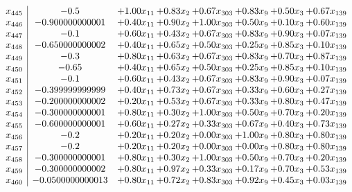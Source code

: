 \documentclass[8pt]{article}
\begin{document}
\[\begin{array}{c| c c@{\hskip 2pt} c@{\hskip 2pt} c@{\hskip 2pt} c@{\hskip 2pt} c@{\hskip 2pt} c@{\hskip 2pt} }
 x_{445}   &  -0.5 & +  1.00 x_{11} & +  0.83 x_{2} & +  0.67 x_{303} & +  0.83 x_{9} & +  0.50 x_{3} & +  0.67 x_{139}\\
 x_{446}   &  -0.900000000001 & +  0.40 x_{11} & +  0.90 x_{2} & +  1.00 x_{303} & +  0.50 x_{9} & +  0.10 x_{3} & +  0.60 x_{139}\\
 x_{447}   &  -0.1 & +  0.60 x_{11} & +  0.43 x_{2} & +  0.67 x_{303} & +  0.83 x_{9} & +  0.90 x_{3} & +  0.07 x_{139}\\
 x_{448}   &  -0.650000000002 & +  0.40 x_{11} & +  0.65 x_{2} & +  0.50 x_{303} & +  0.25 x_{9} & +  0.85 x_{3} & +  0.10 x_{139}\\
 x_{449}   &  -0.3 & +  0.80 x_{11} & +  0.63 x_{2} & +  0.67 x_{303} & +  0.83 x_{9} & +  0.70 x_{3} & +  0.87 x_{139}\\
 x_{450}   &  -0.65 & +  0.40 x_{11} & +  0.65 x_{2} & +  0.50 x_{303} & +  0.25 x_{9} & +  0.85 x_{3} & +  0.10 x_{139}\\
 x_{451}   &  -0.1 & +  0.60 x_{11} & +  0.43 x_{2} & +  0.67 x_{303} & +  0.83 x_{9} & +  0.90 x_{3} & +  0.07 x_{139}\\
 x_{452}   &  -0.399999999999 & +  0.40 x_{11} & +  0.73 x_{2} & +  0.67 x_{303} & +  0.33 x_{9} & +  0.60 x_{3} & +  0.27 x_{139}\\
 x_{453}   &  -0.200000000002 & +  0.20 x_{11} & +  0.53 x_{2} & +  0.67 x_{303} & +  0.33 x_{9} & +  0.80 x_{3} & +  0.47 x_{139}\\
 x_{454}   &  -0.300000000001 & +  0.80 x_{11} & +  0.30 x_{2} & +  1.00 x_{303} & +  0.50 x_{9} & +  0.70 x_{3} & +  0.20 x_{139}\\
 x_{455}   &  -0.600000000001 & +  0.60 x_{11} & +  0.27 x_{2} & +  0.33 x_{303} & +  0.67 x_{9} & +  0.40 x_{3} & +  0.73 x_{139}\\
 x_{456}   &  -0.2 & +  0.20 x_{11} & +  0.20 x_{2} & +  0.00 x_{303} & +  1.00 x_{9} & +  0.80 x_{3} & +  0.80 x_{139}\\
 x_{457}   &  -0.2 & +  0.20 x_{11} & +  0.20 x_{2} & +  0.00 x_{303} & +  0.00 x_{9} & +  0.80 x_{3} & +  0.80 x_{139}\\
 x_{458}   &  -0.300000000001 & +  0.80 x_{11} & +  0.30 x_{2} & +  1.00 x_{303} & +  0.50 x_{9} & +  0.70 x_{3} & +  0.20 x_{139}\\
 x_{459}   &  -0.300000000002 & +  0.80 x_{11} & +  0.97 x_{2} & +  0.33 x_{303} & +  0.17 x_{9} & +  0.70 x_{3} & +  0.53 x_{139}\\
 x_{460}   &  -0.0500000000013 & +  0.80 x_{11} & +  0.72 x_{2} & +  0.83 x_{303} & +  0.92 x_{9} & +  0.45 x_{3} & +  0.03 x_{139}\\

\end{array}\]
\end{document}
